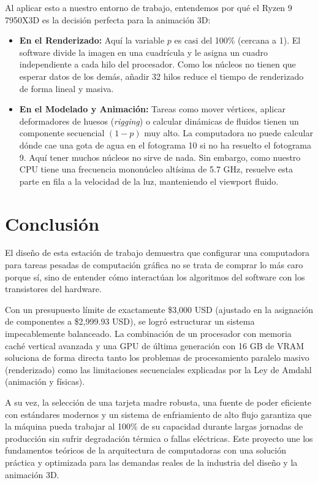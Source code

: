 \documentclass[14pt,a4paper]{extarticle}
\begin{document}
Al aplicar esto a nuestro entorno de trabajo, entendemos por qué el Ryzen 9 7950X3D es la decisión perfecta para la animación 3D:

\begin{itemize}
    \item \textbf{En el Renderizado:} Aquí la variable $p$ es casi del 100\% (cercana a 1). El software divide la imagen en una cuadrícula y le asigna un cuadro independiente a cada hilo del procesador. Como los núcleos no tienen que esperar datos de los demás, añadir 32 hilos reduce el tiempo de renderizado de forma lineal y masiva.
    \item \textbf{En el Modelado y Animación:} Tareas como mover vértices, aplicar deformadores de huesos (\textit{rigging}) o calcular dinámicas de fluidos tienen un componente secuencial $(1-p)$ muy alto. La computadora no puede calcular dónde cae una gota de agua en el fotograma 10 si no ha resuelto el fotograma 9. Aquí tener muchos núcleos no sirve de nada. Sin embargo, como nuestro CPU tiene una frecuencia mononúcleo altísima de 5.7 GHz, resuelve esta parte en fila a la velocidad de la luz, manteniendo el viewport fluido.
\end{itemize}

\section*{\centering Conclusión}

El diseño de esta estación de trabajo demuestra que configurar una computadora para tareas pesadas de computación gráfica no se trata de comprar lo más caro porque sí, sino de entender cómo interactúan los algoritmos del software con los transistores del hardware. 

Con un presupuesto límite de exactamente \$3,000 USD (ajustado en la asignación de componentes a \$2,999.93 USD), se logró estructurar un sistema impecablemente balanceado. La combinación de un procesador con memoria caché vertical avanzada y una GPU de última generación con 16 GB de VRAM soluciona de forma directa tanto los problemas de procesamiento paralelo masivo (renderizado) como las limitaciones secuenciales explicadas por la Ley de Amdahl (animación y físicas). 

A su vez, la selección de una tarjeta madre robusta, una fuente de poder eficiente con estándares modernos y un sistema de enfriamiento de alto flujo garantiza que la máquina pueda trabajar al 100\% de su capacidad durante largas jornadas de producción sin sufrir degradación térmica o fallas eléctricas. Este proyecto une los fundamentos teóricos de la arquitectura de computadoras con una solución práctica y optimizada para las demandas reales de la industria del diseño y la animación 3D.
\end{document}

